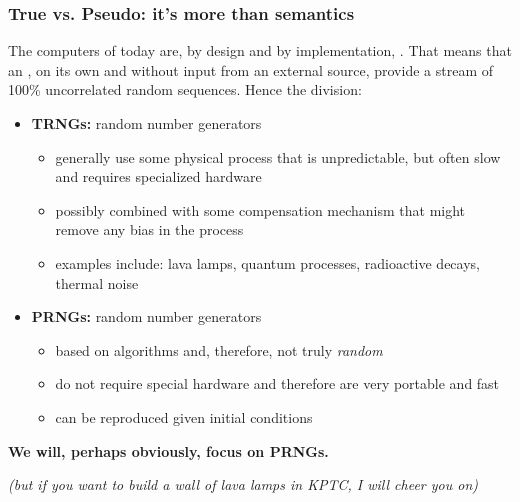 \documentclass[hyperref={colorlinks=true}]{beamer}
\begin{document}
\begin{frame}%
  \frametitle{True vs. Pseudo: it's more than semantics}
  
  The computers of today are, by design and by implementation, .  That means that an , on its own and without input from an external source, provide a stream of 100\% uncorrelated random sequences. Hence the division:
  
  \begin{itemize}
    \item \textbf{TRNGs:}  random number generators
    \begin{itemize}
      \item generally use some physical process that is unpredictable, but often slow and requires specialized hardware
      \item possibly combined with some compensation mechanism that might remove any bias in the process
      \item examples include: lava lamps, quantum processes, radioactive decays, thermal noise
    \end{itemize}
    \item \textbf{PRNGs:} random number generators
    \begin{itemize}
      \item based on algorithms and, therefore, not truly \textit{random}
      \item do not require special hardware and therefore are very portable and fast
      \item can be reproduced given initial conditions
    \end{itemize}
  \end{itemize}
  
  \centering \textbf{We will, perhaps obviously, focus on PRNGs.} 
  
  \textit{(but if you want to build a wall of lava lamps in KPTC, I will cheer you on)}

\end{frame}

\end{document}
